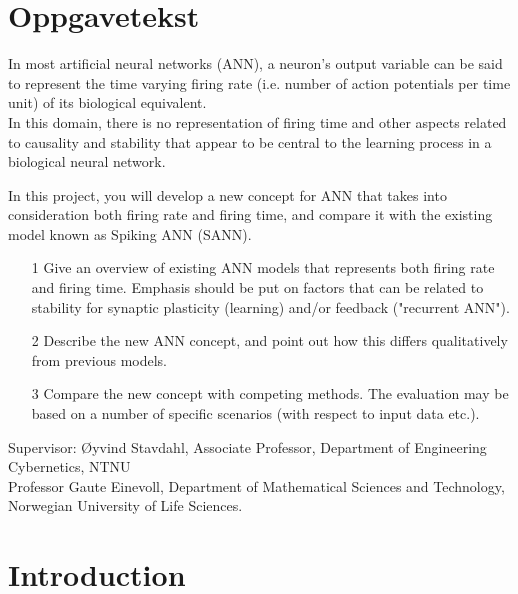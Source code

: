 







%

\newpage
\section{Oppgavetekst}
In most artificial neural networks (ANN),  a neuron's output variable can be said to represent the time varying firing rate (i.e. number of action potentials per time unit) of its biological equivalent.\\
In this domain, there is no representation of firing time and other aspects related to causality and stability that appear to be central to the learning process in a biological neural network.
 
 In this project, you will develop a new concept for ANN that takes into consideration both firing rate and firing time, and compare it with the existing model known as Spiking ANN (SANN).
 \begin{itemize} 
  \item[1] Give an overview of existing ANN models that represents both firing rate and firing time. Emphasis should be put on factors that can be related to stability for synaptic plasticity (learning) and/or feedback ("recurrent ANN").
  \item[2] Describe the new ANN concept, and point out how this differs qualitatively from previous models.
  \item[3] Compare the new concept with competing methods. The evaluation may be based on a number of specific scenarios (with respect to input data etc.).
 \end{itemize}

 Supervisor:      Øyvind Stavdahl, Associate Professor, Department of Engineering Cybernetics, NTNU\\
                  Professor Gaute Einevoll, Department of Mathematical Sciences and Technology, Norwegian University of Life Sciences.
\newpage

\section{Introduction}


